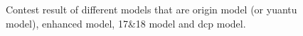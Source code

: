 \documentclass[a4paper]{article}
\begin{document}
\begin{figure}
{		}
		\caption{Contest result of different models that are origin model (or yuantu model), enhanced model, 17\&18 model and dcp model.} 
		\label{p2} %
	\end{figure}  
	
\end{document}

